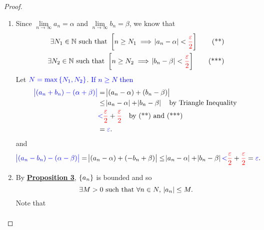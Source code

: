 \documentclass[11pt,openany]{article}
\begin{document}
\begin{proof}
\begin{enumerate}[(1)]
\begin{center}
	\end{center}
	\item Since $\lim\limits_{n\to\infty}a_n=\alpha$ and $\lim\limits_{n\to\infty}b_n=\beta$, we know that \begin{align*}
		\exists N_1\in\mathbb{N}\ \text{such that}\ \left[n\geq N_1\implies\abs{a_n-\alpha}<\textcolor{red}{\frac{\varepsilon}{2}}\right]\label{eq:eq2} \tag{**}\\
		\exists N_2\in\mathbb{N}\ \text{such that}\ \left[n\geq N_2\implies\abs{b_n-\beta}<\textcolor{red}{\frac{\varepsilon}{2}}\right]\label{eq:eq3} \tag{***}
	\end{align*} Let $\textcolor{blue}{N=\max\set{N_1,N_2}}$. \textcolor{blue}{If $n\geq N$ then} \begin{align*}
	\textcolor{blue}{\abs{(a_n+ b_n)-(\alpha+ \beta)}}&=\abs{(a_n-\alpha)+(b_n-\beta)}\\
	&\leq\abs{a_n-\alpha}+\abs{b_n-\beta}\quad\text{by Triangle Inequality}\\
	&\textcolor{blue}{<}\textcolor{red}{\frac{\varepsilon}{2}}+\textcolor{red}{\frac{\varepsilon}{2}}\quad\text{by (**) and (***)}\\
	&=\textcolor{blue}{\varepsilon}.
\end{align*} and \[
	\textcolor{blue}{\abs{(a_n- b_n)-(\alpha- \beta)}}=\abs{(a_n-\alpha)+(-b_n+\beta)}\leq\abs{a_n-\alpha}+\abs{b_n-\beta}\textcolor{blue}{<}\textcolor{red}{\frac{\varepsilon}{2}}+\textcolor{red}{\frac{\varepsilon}{2}}=\textcolor{blue}{\varepsilon}.
	\]
	\vfill
	\item  By \hyperlink{pro3}{\textbf{Proposition 3}}, $\set{a_n}$ is bounded and so \[
	\exists M>0\ \text{such that}\ \forall n\in N,\ \abs{a_n}\leq M.
	\] Note that \begin{align*}

\end{align*}
\end{enumerate}
\end{proof}
\end{document}
